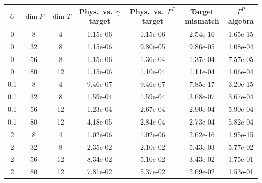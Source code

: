 \begin{tabular}{ccccccc}
\hline
$U$ & $\dim P$ & $\dim T$ & Phys.\ vs.\ $\gamma$ target & Phys.\ vs.\ $\Gamma^P$ target & Target mismatch & $\Gamma^P$ algebra \\
\hline
0 & 8 & 4 & 1.15e-06 & 1.15e-06 & 2.54e-16 & 1.65e-15 \\
0 & 32 & 8 & 1.15e-06 & 9.80e-05 & 9.86e-05 & 1.08e-04 \\
0 & 56 & 8 & 1.15e-06 & 1.36e-04 & 1.37e-04 & 7.57e-05 \\
0 & 80 & 12 & 1.15e-06 & 1.10e-04 & 1.11e-04 & 1.06e-04 \\
\hline
0.1 & 8 & 4 & 9.46e-07 & 9.46e-07 & 7.85e-17 & 3.20e-15 \\
0.1 & 32 & 8 & 1.59e-04 & 1.59e-04 & 3.68e-07 & 3.67e-04 \\
0.1 & 56 & 12 & 1.23e-04 & 2.67e-04 & 2.90e-04 & 5.90e-04 \\
0.1 & 80 & 12 & 4.18e-05 & 2.84e-04 & 2.73e-04 & 5.82e-04 \\
\hline
2 & 8 & 4 & 1.02e-06 & 1.02e-06 & 2.62e-16 & 1.95e-15 \\
2 & 32 & 8 & 2.35e-02 & 2.10e-02 & 5.43e-03 & 5.77e-02 \\
2 & 56 & 12 & 8.34e-02 & 5.10e-02 & 3.43e-02 & 1.75e-01 \\
2 & 80 & 12 & 7.81e-02 & 5.37e-02 & 2.69e-02 & 1.53e-01 \\
\hline
\end{tabular}
